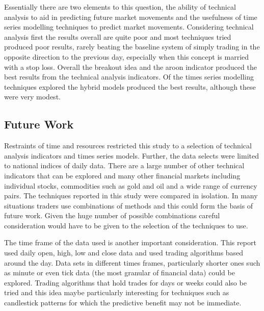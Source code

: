 Essentially there are two elements to this question, the ability of technical analysis to aid in predicting future market movements and the usefulness of time series modelling techniques to predict market movements. Considering technical analysis first the results overall are quite poor and most techniques tried produced poor results, rarely beating the baseline system of simply trading in the opposite direction to the previous day, especially when this concept is married with a stop loss. Overall the breakout idea and the aroon indicator produced the best results from the technical analysis indicators. Of the times series modelling techniques explored the hybrid models produced the best results, although these were very modest. 

\subsection{Future Work}
Restraints of time and resources restricted this study to a selection of technical analysis indicators and times series models. Further, the data selects were limited to national indices of daily data. There are a large number of other technical indicators that can be explored and many other financial markets including individual stocks, commodities such as gold and oil and a wide range of currency pairs. The techniques reported in this study were compared in isolation. In many situations traders use combinations of methods and this could form the basis of future work. Given the huge number of possible combinations careful consideration would have to be given to the selection of the techniques to use.

The time frame of the data used is another important consideration. This report used daily open, high, low and close data and used trading algorithms based around the day. Data sets in different times frames, particularly shorter ones such as minute or even tick data (the most granular of financial data) could be explored. Trading algorithms that hold trades for days or weeks could also be tried and this idea maybe particularly interesting for techniques such as candlestick patterns for which the predictive benefit may not be immediate.
